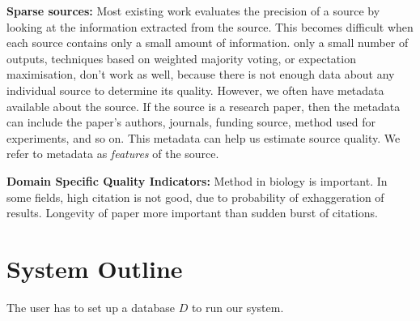 \documentclass{sig-alternate}
\newcounter{prob}
\newcommand{\stitle}[1]{\vspace{0.5em}\noindent\textbf{#1}}
\begin{document}
\stitle{Sparse sources:} Most existing work evaluates the precision of a source by looking at the information extracted from the source. This becomes difficult when each source contains only a small amount of information.  only a small number of outputs, techniques based on weighted majority voting, or expectation maximisation, don't work as well, because there is not enough data about any individual source to determine its quality. However, we often have metadata available about the source. If the source is a research paper, then the metadata can include the paper's authors, journals, funding source, method used for experiments, and so on. This metadata can help us estimate source quality. We refer to metadata as {\em features} of the source. 

\stitle{Domain Specific Quality Indicators:} Method in biology is important. In some fields, high citation is not good, due to probability of exhaggeration of results. Longevity of paper more important than sudden burst of citations. 

\section{System Outline} 

The user has to set up a database $D$ to run our system.
\end{document}
